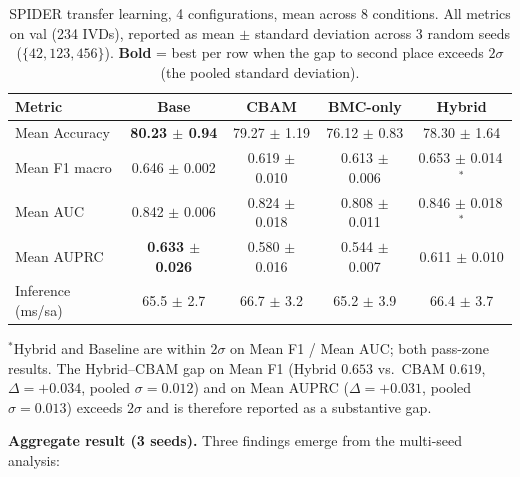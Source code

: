 \documentclass[conference]{IEEEtran}
\newcommand{\best}[1]{\textcolor{best}{\textbf{#1}}}
\begin{document}
\begin{table}[t]
\centering
\caption{SPIDER transfer learning, 4 configurations, mean across 8
conditions. All metrics on val (234 IVDs), reported as mean $\pm$
standard deviation across 3 random seeds ($\{42, 123, 456\}$).
\textbf{Bold} = best per row when the gap to second place exceeds
$2\sigma$ (the pooled standard deviation).}
\label{tab:spider_transfer_agg}
\renewcommand{\arraystretch}{1.05}
\footnotesize
\begin{tabular}{@{}lcccc@{}}
\toprule
Metric & Base & CBAM & BMC-only & Hybrid \\
\midrule
Mean Accuracy        & \best{80.23 $\pm$ 0.94} & 79.27 $\pm$ 1.19 & 76.12 $\pm$ 0.83 & 78.30 $\pm$ 1.64 \\
Mean F1 macro        & 0.646 $\pm$ 0.002 & 0.619 $\pm$ 0.010 & 0.613 $\pm$ 0.006 & 0.653 $\pm$ 0.014\,$^\ast$ \\
Mean AUC             & 0.842 $\pm$ 0.006 & 0.824 $\pm$ 0.018 & 0.808 $\pm$ 0.011 & 0.846 $\pm$ 0.018\,$^\ast$ \\
Mean AUPRC           & \best{0.633 $\pm$ 0.026} & 0.580 $\pm$ 0.016 & 0.544 $\pm$ 0.007 & 0.611 $\pm$ 0.010 \\
\midrule
Inference (ms/sa)    & 65.5 $\pm$ 2.7 & 66.7 $\pm$ 3.2 & 65.2 $\pm$ 3.9 & 66.4 $\pm$ 3.7 \\
\bottomrule
\end{tabular}

\vspace{2pt}
\par
{\raggedright\scriptsize
$^\ast$Hybrid and Baseline are within $2\sigma$ on Mean F1 / Mean AUC;
both pass-zone results. The Hybrid--CBAM gap on Mean F1 (Hybrid
$0.653$ vs.\ CBAM $0.619$, $\Delta = +0.034$, pooled $\sigma =
0.012$) and on Mean AUPRC ($\Delta = +0.031$, pooled $\sigma =
0.013$) exceeds $2\sigma$ and is therefore reported as a substantive
gap.\par}
\end{table}

\textbf{Aggregate result (3 seeds).} Three findings emerge from the
multi-seed analysis:
\end{document}
